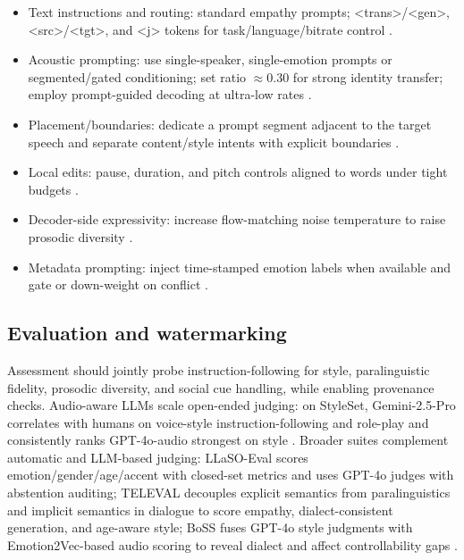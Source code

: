 \documentclass{article}
\begin{document}
\begin{itemize}
\item Text instructions and routing: standard empathy prompts; <trans>/<gen>, <src>/<tgt>, and <j> tokens for task/language/bitrate control \cite{wang2024blspemotowardsempatheticlargespeechlangu,peng2024mslms2stmultitaskspeechlanguagemodeltext}.
\item Acoustic prompting: use single-speaker, single-emotion prompts or segmented/gated conditioning; set ratio $\approx$0.30 for strong identity transfer; employ prompt-guided decoding at ultra-low rates \cite{peng2024empiricalstudyspeechlanguagemodelsprompt,gong2024seamlessexpressivelmspeechlanguagemodele,wang2025tadicodectextawarediffusionspeechtokeniz}.
\item Placement/boundaries: dedicate a prompt segment adjacent to the target speech and separate content/style intents with explicit boundaries \cite{wu2024speechcomposerunifyingmultiplespeechtask}.
\item Local edits: pause, duration, and pitch controls aligned to words under tight budgets \cite{huang2023holisticcascadesystembenchmarkhumanevalu}.
\item Decoder-side expressivity: increase flow-matching noise temperature to raise prosodic diversity \cite{yuan2024continuousspeechtokensmakesllmsrobustmul}.
\item Metadata prompting: inject time-stamped emotion labels when available and gate or down-weight on conflict \cite{wang2025incorporatingcontextualparalinguisticund}.
\end{itemize}

\subsection{Evaluation and watermarking} \label{subsec:Evaluation and watermarking}
Assessment should jointly probe instruction-following for style, paralinguistic fidelity, prosodic diversity, and social cue handling, while enabling provenance checks. Audio-aware LLMs scale open-ended judging: on StyleSet, Gemini-2.5-Pro correlates with humans on voice-style instruction-following and role-play and consistently ranks GPT-4o-audio strongest on style \cite{chiang2025audioawarelargelanguagemodelsasjudgesspe}. Broader suites complement automatic and LLM-based judging: LLaSO-Eval scores emotion/gender/age/accent with closed-set metrics and uses GPT-4o judges with abstention auditing; TELEVAL decouples explicit semantics from paralinguistics and implicit semantics in dialogue to score empathy, dialect-consistent generation, and age-aware style; BoSS fuses GPT-4o style judgments with Emotion2Vec-based audio scoring to reveal dialect and affect controllability gaps \cite{sun2025llasofoundationalframeworkreproduciblere,li2025televaldynamicbenchmarkdesignedspokenlan,wang2025bossbeyondsemanticspeech}. 
\end{document}
